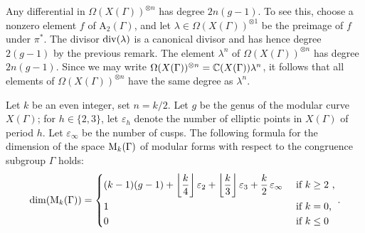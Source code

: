 \begin{rmk} \label{pr:degree-diff}
 Any differential in $\Omega(X(\Gamma))^{\otimes n}$ has degree $2n(g-1)$. To see this, choose a nonzero element $f$ of $\mathrm{A}_2(\Gamma)$, and let $\lambda\in\Omega(X(\Gamma))^{\otimes 1}$ be the preimage of $f$ under $\pi^*$. The divisor $\operatorname{div}(\lambda)$ is a canonical divisor and has hence degree $2(g-1)$ by the previous remark. The element $\lambda^n$ of $\Omega(X(\Gamma))^{\otimes n}$ has degree $2n(g-1)$. Since we may write $\Omega(X(\Gamma))^{\otimes n}=\mathbb{C}(X(\Gamma))\lambda^{n}$, it follows that all elements of $\Omega(X(\Gamma))^{\otimes n}$ have the same degree as $\lambda^{n}$.
\end{rmk}

\begin{thm}
 Let $k$ be an even integer, set $n=k/2$. Let $g$ be the genus of the modular curve $X(\Gamma)$; for $h\in\{2,3\}$, let $\varepsilon_h$ denote the number of elliptic points in $X(\Gamma)$ of period $h$. Let $\varepsilon_\infty$ be the number of cusps. The following formula for the dimension of the space $\mathrm{M}_k(\Gamma)$ of modular forms with respect to the congruence subgroup $\Gamma$ holds:
 \[
  \dim(\mathrm{M}_k(\Gamma))=\begin{dcases}
                      (k-1)(g-1)+\left \lfloor \frac{k}{4} \right\rfloor\varepsilon_2+\left \lfloor \frac{k}{3} \right\rfloor\varepsilon_3+\frac{k}{2}\,\varepsilon_\infty & \text{ if $k\geq 2$ ,}\\
                      1 & \text{ if $k=0$,}\\
                      0 & \text{ if $k\leq 0$}
                     \end{dcases}.
 \]
\end{thm}
